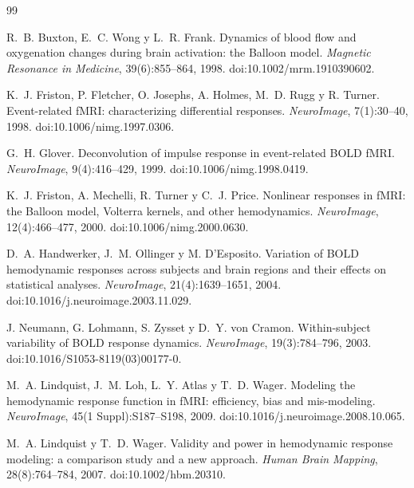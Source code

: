 \begin{thebibliography}{99}

R.~B. Buxton, E.~C. Wong y L.~R. Frank.
\newblock Dynamics of blood flow and oxygenation changes during brain activation: the Balloon model.
\newblock \emph{Magnetic Resonance in Medicine}, 39(6):855--864, 1998.
\newblock doi:10.1002/mrm.1910390602.

K.~J. Friston, P. Fletcher, O. Josephs, A. Holmes, M.~D. Rugg y R. Turner.
\newblock Event-related fMRI: characterizing differential responses.
\newblock \emph{NeuroImage}, 7(1):30--40, 1998.
\newblock doi:10.1006/nimg.1997.0306.

G.~H. Glover.
\newblock Deconvolution of impulse response in event-related BOLD fMRI.
\newblock \emph{NeuroImage}, 9(4):416--429, 1999.
\newblock doi:10.1006/nimg.1998.0419.

K.~J. Friston, A. Mechelli, R. Turner y C.~J. Price.
\newblock Nonlinear responses in fMRI: the Balloon model, Volterra kernels, and other hemodynamics.
\newblock \emph{NeuroImage}, 12(4):466--477, 2000.
\newblock doi:10.1006/nimg.2000.0630.

D.~A. Handwerker, J.~M. Ollinger y M. D'Esposito.
\newblock Variation of BOLD hemodynamic responses across subjects and brain regions and their effects on statistical analyses.
\newblock \emph{NeuroImage}, 21(4):1639--1651, 2004.
\newblock doi:10.1016/j.neuroimage.2003.11.029.

J. Neumann, G. Lohmann, S. Zysset y D.~Y. von Cramon.
\newblock Within-subject variability of BOLD response dynamics.
\newblock \emph{NeuroImage}, 19(3):784--796, 2003.
\newblock doi:10.1016/S1053-8119(03)00177-0.

M.~A. Lindquist, J.~M. Loh, L.~Y. Atlas y T.~D. Wager.
\newblock Modeling the hemodynamic response function in fMRI: efficiency, bias and mis-modeling.
\newblock \emph{NeuroImage}, 45(1 Suppl):S187--S198, 2009.
\newblock doi:10.1016/j.neuroimage.2008.10.065.

M.~A. Lindquist y T.~D. Wager.
\newblock Validity and power in hemodynamic response modeling: a comparison study and a new approach.
\newblock \emph{Human Brain Mapping}, 28(8):764--784, 2007.
\newblock doi:10.1002/hbm.20310.


\end{thebibliography}
